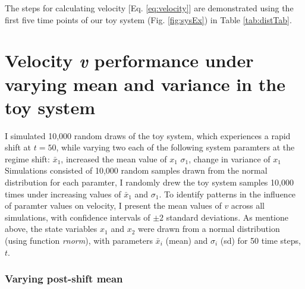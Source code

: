 \documentclass[12pt,twoside,openany]{reedthesis}
\begin{document}
The steps for calculating velocity {[}Eq. \eqref{eq:velocity}{]} are demonstrated using the first five time points of our toy system (Fig. \ref{fig:sysEx}) in Table \ref{tab:distTab}.

\hypertarget{velocity-v-performance-under-varying-mean-and-variance-in-the-toy-system}{%
\section{\texorpdfstring{Velocity \emph{v} performance under varying mean and variance in the toy system}{Velocity v performance under varying mean and variance in the toy system}}\label{velocity-v-performance-under-varying-mean-and-variance-in-the-toy-system}}

I simulated 10,000 random draws of the toy system, which experiences a rapid shift at \(t = 50\), while varying two each of the following system paramters at the regime shift:
\(\bar{x}_1\), increased the mean value of \(x_1\)
\(\sigma_1\), change in variance of \(x_1\)
Simulations consisted of 10,000 random samples drawn from the normal distribution for each paramter, I randomly drew the toy system samples 10,000 times under increasing values of \(\bar{x}_1\) and \(\sigma_1\). To identify patterns in the influence of paramter values on velocity, I present the mean values of \(v\) across all simulations, with confidence intervals of \(\pm 2\) standard deviations. As mentione above, the state variables \(x_1\) and \(x_2\) were drawn from a normal distribution (using function \emph{rnorm}), with parameters \(\bar{x}_i\) (mean) and \(\sigma_i\) (sd) for 50 time steps, \(t\).

\hypertarget{varying-post-shift-mean}{%
\subsubsection{Varying post-shift mean}\label{varying-post-shift-mean}}
\end{document}
